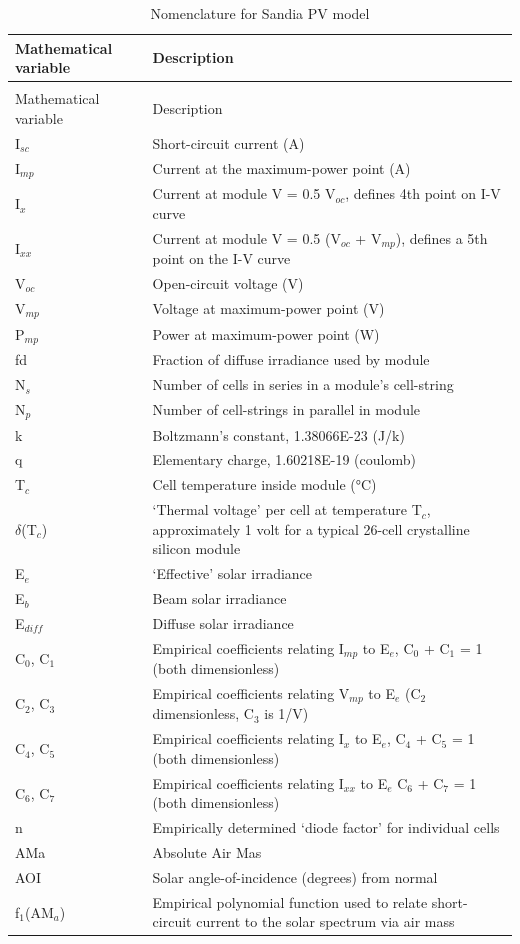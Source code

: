\begin{longtable}[c]{p{1.2in}p{4.8in}}
\caption{Nomenclature for Sandia PV model \label{table:nomenclature-for-sandia-pv-model}} \tabularnewline
\toprule 
Mathematical variable & Description \tabularnewline
\midrule
\endfirsthead

\caption[]{Nomenclature for Sandia PV model} \tabularnewline
\toprule 
Mathematical variable & Description \tabularnewline
\midrule
\endhead

I\(_{sc}\) & Short-circuit current (A) \tabularnewline
I\(_{mp}\) & Current at the maximum-power point (A) \tabularnewline
I\(_{x}\) & Current at module V = 0.5 V\(_{oc}\), defines 4th point on I-V curve \tabularnewline
I\(_{xx}\) & Current at module V = 0.5 (V\(_{oc}\) + V\(_{mp}\)), defines a 5th point on the I-V curve \tabularnewline
V\(_{oc}\) & Open-circuit voltage (V) \tabularnewline
V\(_{mp}\) & Voltage at maximum-power point (V) \tabularnewline
P\(_{mp}\) & Power at maximum-power point (W) \tabularnewline
fd & Fraction of diffuse irradiance used by module \tabularnewline
N\(_{s}\) & Number of cells in series in a module’s cell-string \tabularnewline
N\(_{p}\) & Number of cell-strings in parallel in module \tabularnewline
k & Boltzmann’s constant, 1.38066E-23 (J/k) \tabularnewline
q & Elementary charge, 1.60218E-19 (coulomb) \tabularnewline
T\(_{c}\) & Cell temperature inside module (°C) \tabularnewline
$\delta$(T\(_{c}\)) & ‘Thermal voltage’ per cell at temperature T\(_{c}\), approximately 1 volt for a typical 26-cell crystalline silicon module \tabularnewline
E\(_{e}\) & ‘Effective’ solar irradiance \tabularnewline
E\(_{b}\) & Beam solar irradiance \tabularnewline
E\(_{diff}\) & Diffuse solar irradiance \tabularnewline
C\(_{0}\), C\(_{1}\) & Empirical coefficients relating I\(_{mp}\) to E\(_{e}\), C\(_{0}\) + C\(_{1}\) = 1 (both dimensionless) \tabularnewline
C\(_{2}\), C\(_{3}\) & Empirical coefficients relating V\(_{mp}\) to E\(_{e}\) (C\(_{2}\) dimensionless, C\(_{3}\) is 1/V) \tabularnewline
C\(_{4}\), C\(_{5}\) & Empirical coefficients relating I\(_{x}\) to E\(_{e}\), C\(_{4}\) + C\(_{5}\) = 1 (both dimensionless) \tabularnewline
C\(_{6}\), C\(_{7}\) & Empirical coefficients relating I\(_{xx}\) to E\(_{e}\) C\(_{6}\) + C\(_{7}\) = 1 (both dimensionless) \tabularnewline
n & Empirically determined ‘diode factor’ for individual cells \tabularnewline
AMa & Absolute Air Mas \tabularnewline
AOI & Solar angle-of-incidence (degrees) from normal \tabularnewline
f\(_{1}\)(AM\(_{a}\)) & Empirical polynomial function used to relate short-circuit current to the solar spectrum via air mass \tabularnewline

\end{longtable}
